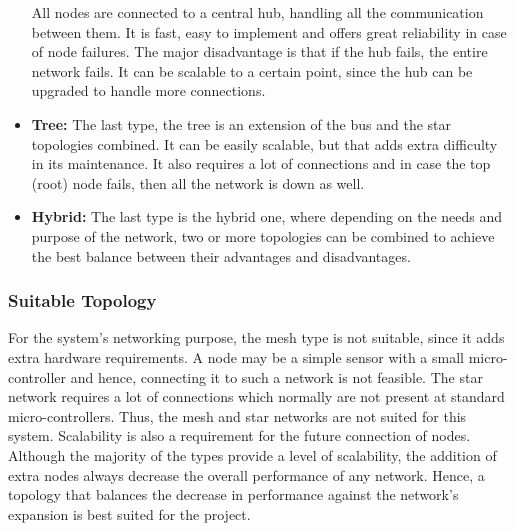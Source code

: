 \begin{itemize}
All nodes are connected to a central hub, handling all the communication between them.
It is fast, easy to implement and offers great reliability in case of node failures.
The major disadvantage is that if the hub fails, the entire network fails.
It can be scalable to a certain point, since the hub can be upgraded to handle more connections.
\item \textbf{Tree:} The last type, the tree is an extension of the bus and the star topologies combined.
It can be easily scalable, but that adds extra difficulty in its maintenance.
It also requires a lot of connections and in case the top (root) node fails, then all the network is down as well.
\item \textbf{Hybrid:} The last type is the hybrid one, where depending on the needs and purpose of the network, two or more topologies can be combined to achieve the best balance between their advantages and disadvantages.
\end{itemize}

\subsubsection{Suitable Topology}
For the system's networking purpose, the mesh type is not suitable, since it adds extra hardware requirements.
A node may be a simple sensor with a small micro-controller and hence, connecting it to such a network is not feasible.
The star network requires a lot of connections which normally are not present at standard micro-controllers.
Thus, the mesh and star networks are not suited for this system.
Scalability is also a requirement for the future connection of nodes.
Although the majority of the types provide a level of scalability, the addition of extra nodes always decrease the overall performance of any network.
Hence, a topology that balances the decrease in performance against the network's expansion is best suited for the project.\\

